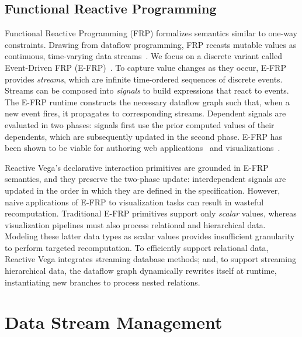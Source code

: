 \vspace{-10pt}

\subsection{Functional Reactive Programming}

\vspace{-7pt}

Functional Reactive Programming (FRP) formalizes semantics similar to one-way
constraints. Drawing from dataflow programming, FRP recasts mutable values as
continuous, time-varying data streams~\cite{bainomugisha:frpsurvey}. We focus on
a discrete variant called Event-Driven FRP (E-FRP)~\cite{wan:efrp}. To capture
value changes as they occur, E-FRP provides \emph{streams}, which are infinite
time-ordered sequences of discrete events. Streams can be composed into
\emph{signals} to build expressions that react to events. The E-FRP runtime
constructs the necessary dataflow graph such that, when a new event fires, it
propagates to corresponding streams. Dependent signals are evaluated in two
phases: signals first use the prior computed values of their dependents, which
are subsequently updated in the second phase. E-FRP has been shown to be viable
for authoring web applications~\cite{czaplicki:elm, meyerovich:flapjax} and
visualizations~\cite{cottam:stencil, kelleher:modeljs}.

Reactive Vega's declarative interaction primitives are grounded in E-FRP
semantics, and they preserve the two-phase update: interdependent signals are
updated in the order in which they are defined in the specification. However,
naive applications of E-FRP to visualization tasks can result in wasteful
recomputation. Traditional E-FRP primitives support only \emph{scalar} values,
whereas visualization pipelines must also process relational and hierarchical
data. Modeling these latter data types as scalar values provides insufficient
granularity to perform targeted recomputation. To efficiently support relational
data, Reactive Vega integrates streaming database methods; and, to support
streaming hierarchical data, the dataflow graph dynamically rewrites itself at
runtime, instantiating new branches to process nested relations.

\vspace{-10pt}

\section{Data Stream Management}

